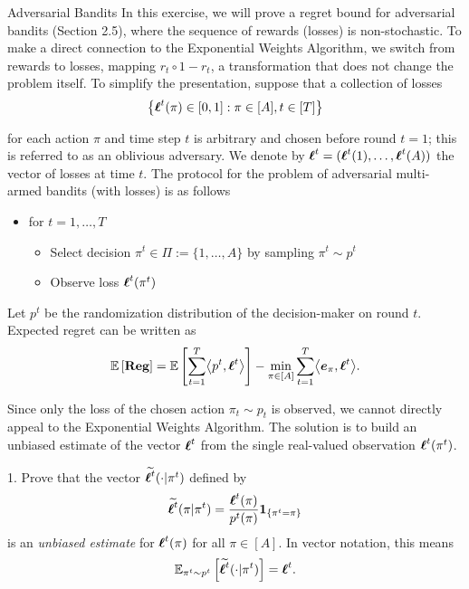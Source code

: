 
\begin{exercise}[]{Adversarial Bandits}
    In this exercise, we will prove a regret bound for adversarial bandits
     (Section 2.5), where the sequence of rewards (losses) is non-stochastic.
      To make a direct connection to the Exponential Weights Algorithm, we switch from rewards to losses,       
       mapping $r_t\circ1-r_t$, a transformation that does not change the problem itself. 
       To simplify the presentation, suppose that a collection of losses
       \[\left \{ \bsl^t(\pi) \in [0,1] : \pi \in [A], t \in [T]\right \} \]


       for each action $\pi$ and time step $t$ is arbitrary and chosen before round $t = 1$;
        this is referred to as an oblivious adversary. We denote by $\bsl^t = (\bsl^t (1), \ldots , \bsl^t(A))$
         the vector of losses at time $t$. The protocol for the problem of adversarial multi-armed bandits (with losses) is as follows
         \begin{itemize}
            \item for $t=1,\ldots,T$ 
            \begin{itemize}
                \item Select decision $\pi^t\in \Pi:=\{1,\ldots,A\}$ by sampling $\pi^t \sim p^t$
                \item Observe loss $\bsl^t(\pi^t)$
            \end{itemize}
         \end{itemize}

         Let $p^t$ be the randomization distribution of the decision-maker on round $t$. 
         Expected regret can be written as
         \[ \EE{\Reg} = \EE{\sum_{t=1}^T \biprod{p^t}{\bsl^t}} - \min_{\pi \in [A]}\sum_{t=1}^T \biprod{\boldsymbol{e}_\pi}{\bsl^t}.\]

Since only the loss of the chosen action $\pi_t \sim p_t$ is observed, we cannot directly appeal to the Exponential Weights Algorithm. 
The solution is to build an unbiased estimate of the vector $ \bsl^t $ from the single real-valued observation $\bsl^t(\pi^t)$.

1. Prove that the vector $\wt {\bsl^t} (\cdot| \pi^t)$ defined by
\[ \wt{\bsl^t}(\pi | \pi^t) = \frac{\bsl^t(\pi)}{p^t(\pi)} \mathbf{1}_{\{\pi^t=\pi\}}\]
is an \textit{unbiased estimate} for $\bsl^t(\pi)$ for all $\pi \in [A]$. In vector notation, this means 
\[ \EEs{\wt{\bsl^t}(\cdot|\pi^t)}{\pi^t \sim p^t}=\bsl^t.\]


\end{exercise}
